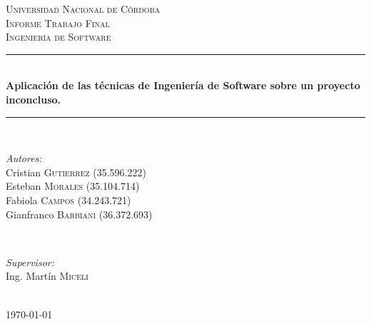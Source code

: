 \documentclass[10pt]{article} %
\begin{document}

\begin{titlepage}

\newcommand{\HRule}{\rule{\linewidth}{0.5mm}} %

\center %

\textsc{\LARGE Universidad Nacional de Córdoba}\\[1.5cm] %
\textsc{\Large Informe Trabajo Final}\\[0.5cm] %
\textsc{\large Ingeniería de Software}\\[0.5cm] %

\HRule \\[0.4cm]
\Large{ \huge \bfseries Aplicación de las técnicas de Ingeniería de Software sobre un proyecto inconcluso.}\par %
\HRule \\[1.5cm]

\begin{minipage}{0.5\textwidth}
\begin{flushleft} \large
\emph{Autores:}\\
Cristian \textsc{Gutierrez} (35.596.222)\\
Esteban \textsc{Morales} (35.104.714)\\
Fabiola \textsc{Campos} (34.243.721)\\
Gianfranco \textsc{Barbiani} (36.372.693)\\
\end{flushleft}
\end{minipage}
~
\begin{minipage}{0.4\textwidth}
\begin{flushright} \large
\emph{Supervisor:} \\
Ing. Martín \textsc{Miceli}
\end{flushright}
\end{minipage}\\[4cm]

{\large \today}\\[3cm] %


\vfill %
\restoregeometry
\end{titlepage}
\end{document}
